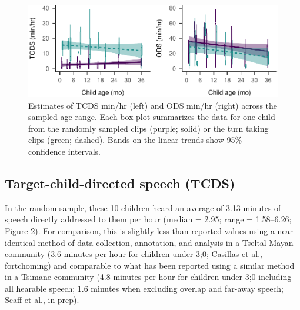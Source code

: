 \documentclass[,man,floatsintext]{apa6}
\begin{document}
\begin{figure}
\centering
\includegraphics{Yeli-CLE_files/figure-latex/fig2-1.pdf}
\caption{\label{fig:fig2}Estimates of TCDS min/hr (left) and ODS min/hr
(right) across the sampled age range. Each box plot summarizes the data
for one child from the randomly sampled clips (purple; solid) or the
turn taking clips (green; dashed). Bands on the linear trends show 95\%
confidence intervals.}
\end{figure}

\subsection{Target-child-directed speech
(TCDS)}\label{target-child-directed-speech-tcds}

In the random sample, these 10 children heard an average of 3.13 minutes
of speech directly addressed to them per hour (median = 2.95; range =
1.58--6.26; \protect\hyperlink{fig2}{Figure 2}). For comparison, this is
slightly less than reported values using a near-identical method of data
collection, annotation, and analysis in a Tseltal Mayan community (3.6
minutes per hour for children under 3;0; Casillas et al., fortchoming)
and comparable to what has been reported using a similar method in a
Tsimane community (4.8 minutes per hour for children under 3;0 including
all hearable speech; 1.6 minutes when excluding overlap and far-away
speech; Scaff et al., in prep).
\end{document}

